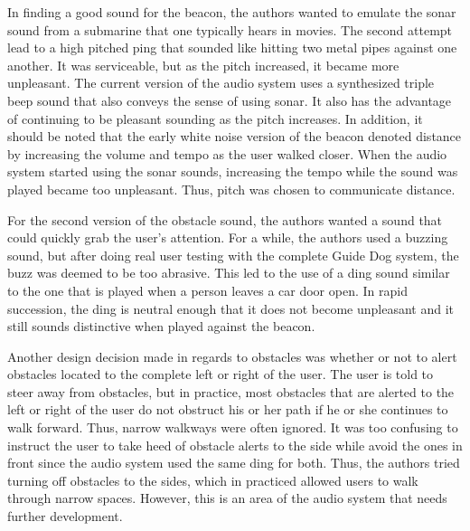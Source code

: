 In finding a good sound for the beacon, the authors wanted to emulate the sonar
sound from a submarine that one typically hears in movies. The second attempt
lead to a high pitched ping that sounded like hitting two metal pipes against
one another. It was serviceable, but as the pitch increased, it became more
unpleasant. The current version of the audio system uses a synthesized triple
beep sound that also conveys the sense of using sonar. It also has the
advantage of continuing to be pleasant sounding as the pitch increases. In
addition, it should be noted that the early white noise version of the beacon
denoted distance by increasing the volume and tempo as the user walked closer.
When the audio system started using the sonar sounds, increasing the tempo
while the sound was played became too unpleasant. Thus, pitch was chosen to
communicate distance.

For the second version of the obstacle sound, the authors wanted a sound that
could quickly grab the user's attention. For a while, the authors used a buzzing
sound, but after doing real user testing with the complete Guide Dog system,
the buzz was deemed to be too abrasive. This led to the use of a ding sound
similar to the one that is played when a person leaves a car door open. In
rapid succession, the ding is neutral enough that it does not become unpleasant
and it still sounds distinctive when played against the beacon.

Another design decision made in regards to obstacles was whether or not to alert
obstacles located to the complete left or right of the user. The user is told to
steer away from obstacles, but in practice, most obstacles that are alerted to the
left or right of the user do not obstruct his or her path if he or she continues
to walk forward. Thus, narrow walkways were often ignored. It was too confusing
to instruct the user to take heed of obstacle alerts to the side while avoid
the ones in front since the audio system used the same ding for both. Thus, the
authors tried turning off obstacles to the sides, which in practiced allowed
users to walk through narrow spaces. However, this is an area of the audio
system that needs further development.

